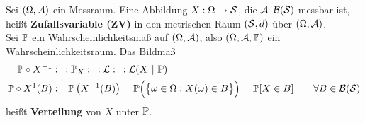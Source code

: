\begin{definition} %
Sei $(\Omega,\A)$ ein Messraum. Eine Abbildung
$X:\Omega\to\S$, die $\A$-$\B(\S)$-messbar ist, heißt \textbf{Zufallsvariable (ZV)} in den metrischen Raum $(\S,d)$ über $(\Omega,\A)$.\\

Sei $\P$ ein Wahrscheinlichkeitsmaß auf $(\Omega,\A)$, also $(\Omega,\A,\P)$ ein Wahrscheinlichkeitsraum. Das Bildmaß
\begin{align*}
\P\circ X^{-1}&:=:\P_X:=:\mathcal{L}:=:\mathcal{L}(X~|~\P)\\
\P\circ X^1(B)&:=\P\left(X^{-1}(B)\right)=\P\Big(\big\lbrace\omega\in\Omega:X(\omega)\in B\big\rbrace\Big)
=\P[X\in B]
\qquad\forall B\in\B(\S)
\end{align*}
heißt \textbf{Verteilung} von $X$ unter $\P$.
\end{definition}